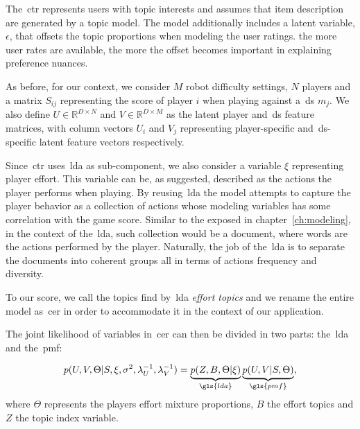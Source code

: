 The~\gls{ctr} represents users with topic interests and assumes that item description are generated by a topic model. The model additionally includes a latent variable, $\epsilon$, that offsets the topic proportions when modeling the user ratings. the more user rates are available, the more the offset becomes important in explaining preference nuances.

As before, for our context, we consider $M$ robot difficulty settings, $N$ players and a matrix $S_{ij}$ representing the score of player $i$ when playing against a~\gls{ds} $m_{j}$. We also define $U \in \mathbb{R}^{D\times N}$ and $V \in \mathbb{R}^{D\times M}$ as the latent player and~\gls{ds} feature matrices, with column vectors $U_i$ and $V_j$ representing player-specific and~\gls{ds}-specific latent feature vectors respectively. 

Since~\gls{ctr} uses~\gls{lda} as sub-component, we also consider a variable $\xi$ representing player effort. This variable can be, as suggested, described as the actions the player performs when playing. By reusing~\gls{lda} the model attempts to capture the player behavior as a collection of actions whose modeling variables has some correlation with the game score. Similar to the exposed in chapter~\ref{ch:modeling}, in the context of the~\gls{lda}, such collection would be a document, where words are the actions performed by the player. Naturally, the job of the~\gls{lda} is to separate the documents into coherent groups all in terms of actions frequency and diversity. 

To our score, we call the topics find by~\gls{lda} \textit{effort topics} and we rename the entire model as~\gls{cer} in order to accommodate it in the context of our application.

The joint likelihood of variables in~\gls{cer} can then be divided in two parts: the~\gls{lda} and the~\gls{pmf}:

\begin{equation}
    p(U,V,\Theta|S,\xi,\sigma^{2},\lambda_{U}^{-1},\lambda_{V}^{-1}) = \underbrace{p(Z,B, \Theta | \xi)}_{\gls{lda}} \underbrace{p(U,V|S,\Theta)}_{\gls{pmf}},
\end{equation}
where $\Theta$ represents the players effort mixture proportions, $B$ the effort topics and $Z$ the topic index variable. %

